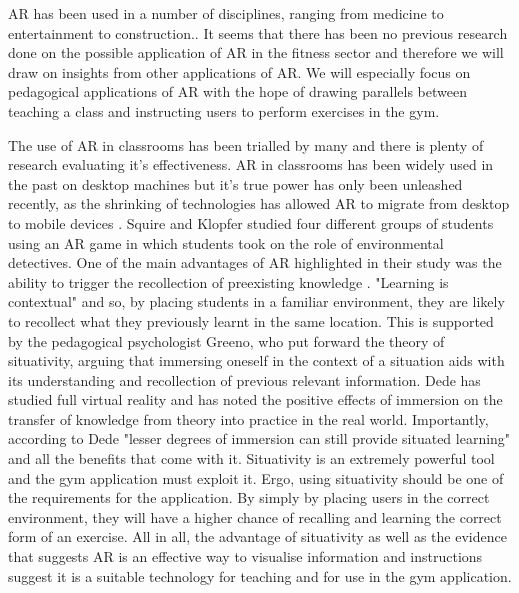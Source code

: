 \documentclass{l4proj}
\begin{document}
AR has been used in a number of disciplines, ranging from medicine to entertainment to construction.\cite{azuma_recent_2001}. It seems that there has been no previous research done on the possible application of AR in the fitness sector and therefore we will draw on insights from other applications of AR. We will especially focus on pedagogical applications of AR with the hope of drawing parallels between teaching a class and instructing users to perform exercises in the gym. 

The use of AR in classrooms has been trialled by many and there is plenty of research evaluating it's effectiveness. AR in classrooms has been widely used in the past on desktop machines \cite{iordache_comparison_2009} but it's true power has only been unleashed recently, as the shrinking of technologies has allowed AR to migrate from desktop to mobile devices \cite{squire_augmented_2007}. Squire and Klopfer studied four different groups of students using an AR game in which students took on the role of environmental detectives. One of the main advantages of AR highlighted in their study was the ability to trigger the recollection of preexisting knowledge \cite{squire_augmented_2007}. "Learning is contextual" \cite{liestol_learning_2011} and so, by placing students in a familiar environment, they are likely to recollect what they previously learnt in the same location. This is supported by the pedagogical psychologist Greeno, who put forward the theory of situativity, arguing that immersing oneself in the context of a situation aids with its understanding and recollection of previous relevant information\cite{greeno_situativity_1998}. Dede has studied full virtual reality and has noted the positive effects of immersion on the transfer of knowledge from theory into practice in the real world\cite{dede_immersive_2009}. Importantly, according to Dede "lesser degrees of immersion can still provide situated learning" and all the benefits that come with it\cite{dede_immersive_2009}. Situativity is an extremely powerful tool and the gym application must exploit it. Ergo, using situativity should be one of the requirements for the application. By simply by placing users in the correct environment, they will have a higher chance of recalling and learning the correct form of an exercise. All in all, the advantage of situativity as well as the evidence that suggests AR is an effective way to visualise information and instructions \cite{squire_augmented_2007} suggest it is a suitable technology for teaching and for use in the gym application.
\end{document}

